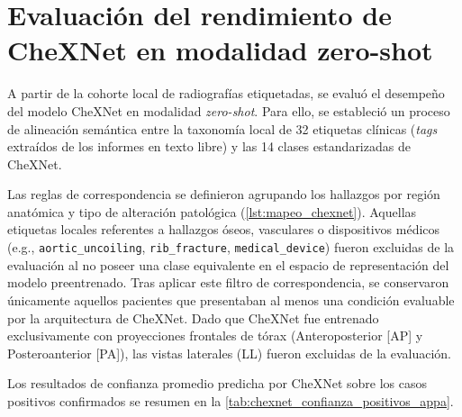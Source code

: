 \documentclass[../tesis.tex]{subfiles}
\begin{document}
\section{Evaluación del rendimiento de CheXNet en modalidad zero-shot}
\label{sec:eval_chexnet}

A partir de la cohorte local de radiografías etiquetadas, se evaluó el desempeño del modelo CheXNet en modalidad \textit{zero-shot}. Para ello, se estableció un proceso de alineación semántica entre la taxonomía local de 32 etiquetas clínicas (\textit{tags} extraídos de los informes en texto libre) y las 14 clases estandarizadas de CheXNet.

Las reglas de correspondencia se definieron agrupando los hallazgos por región anatómica y tipo de alteración patológica (\autoref{lst:mapeo_chexnet}). Aquellas etiquetas locales referentes a hallazgos óseos, vasculares o dispositivos médicos (e.g., \texttt{aortic\_uncoiling}, \texttt{rib\_fracture}, \texttt{medical\_device}) fueron excluidas de la evaluación al no poseer una clase equivalente en el espacio de representación del modelo preentrenado.
Tras aplicar este filtro de correspondencia, se conservaron únicamente aquellos pacientes que presentaban al menos una condición evaluable por la arquitectura de CheXNet. Dado que CheXNet fue entrenado exclusivamente con proyecciones frontales de tórax (Anteroposterior [AP] y Posteroanterior [PA]), las vistas laterales (LL) fueron excluidas de la evaluación.

Los resultados de confianza promedio predicha por CheXNet sobre los casos positivos confirmados se resumen en la \autoref{tab:chexnet_confianza_positivos_appa}.
\end{document}

